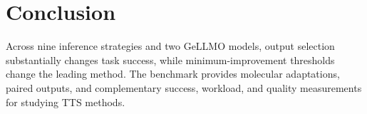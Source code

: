 \section{Conclusion}
Across nine inference strategies and two GeLLMO models, output selection substantially changes task success, while minimum-improvement thresholds change the leading method. The benchmark provides molecular adaptations, paired outputs, and complementary success, workload, and quality measurements for studying TTS methods.
